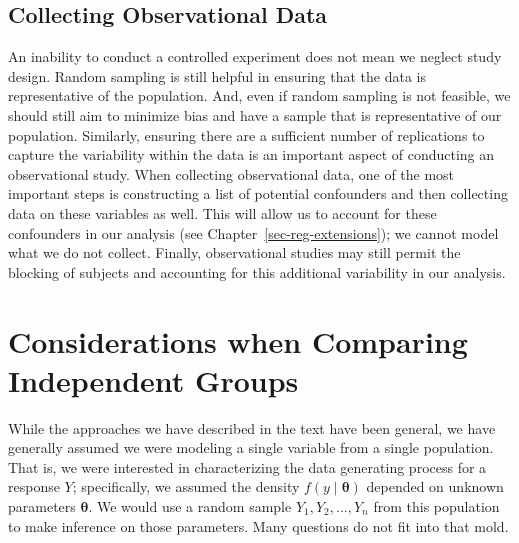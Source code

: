 \documentclass[
  letterpaper,
  DIV=11,
  numbers=noendperiod]{scrreprt}
\theoremstyle{definition}
\theoremstyle{definition}
\theoremstyle{plain}
\theoremstyle{remark}
\begin{document}
\hypertarget{collecting-observational-data}{%
\section{Collecting Observational
Data}\label{collecting-observational-data}}

An inability to conduct a controlled experiment does not mean we neglect
study design. Random sampling is still helpful in ensuring that the data
is representative of the population. And, even if random sampling is not
feasible, we should still aim to minimize bias and have a sample that is
representative of our population. Similarly, ensuring there are a
sufficient number of replications to capture the variability within the
data is an important aspect of conducting an observational study. When
collecting observational data, one of the most important steps is
constructing a list of potential confounders and then collecting data on
these variables as well. This will allow us to account for these
confounders in our analysis (see Chapter~\ref{sec-reg-extensions}); we
cannot model what we do not collect. Finally, observational studies may
still permit the blocking of subjects and accounting for this additional
variability in our analysis.

\hypertarget{sec-independent-groups}{%
\chapter{Considerations when Comparing Independent
Groups}\label{sec-independent-groups}}

\providecommand{\norm}[1]{\lVert#1\rVert}
\providecommand{\abs}[1]{\lvert#1\rvert}
\providecommand{\iid}{\stackrel{\text{IID}}{\sim}}
\providecommand{\ind}{\stackrel{\text{Ind}}{\sim}}

\providecommand{\bm}[1]{\mathbf{#1}}
\providecommand{\bs}[1]{\boldsymbol{#1}}
\providecommand{\bbeta}{\bs{\beta}}

\providecommand{\Ell}{\mathcal{L}}
\providecommand{\indep}{\perp\negthickspace\negmedspace\perp}

While the approaches we have described in the text have been general, we
have generally assumed we were modeling a single variable from a single
population. That is, we were interested in characterizing the data
generating process for a response \(Y\); specifically, we assumed the
density \(f(y \mid \boldsymbol{\theta})\) depended on unknown parameters
\(\boldsymbol{\theta}\). We would use a random sample
\(Y_1, Y_2, \dots, Y_n\) from this population to make inference on those
parameters. Many questions do not fit into that mold.
\end{document}
